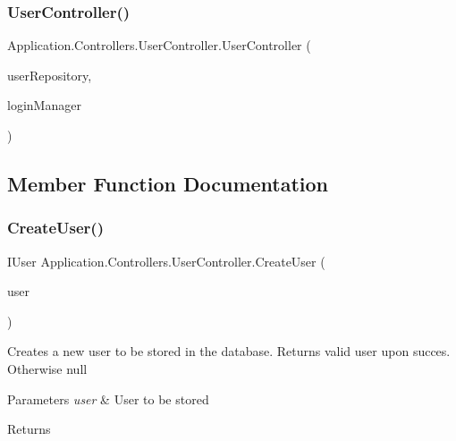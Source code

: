 \subsubsection{\texorpdfstring{User\+Controller()}{UserController()}}
{\footnotesize\ttfamily Application.\+Controllers.\+User\+Controller.\+User\+Controller (\begin{DoxyParamCaption}\item[{I\+User\+Repository}]{user\+Repository,  }\item[{\mbox{\hyperlink{interface_application_1_1_interfaces_1_1_i_login_manager}{I\+Login\+Manager}}}]{login\+Manager }\end{DoxyParamCaption})}



\subsection{Member Function Documentation}
\mbox{\label{class_application_1_1_controllers_1_1_user_controller_abf08955a5adc363fa137399a961a14fc}} 
\subsubsection{\texorpdfstring{Create\+User()}{CreateUser()}}
{\footnotesize\ttfamily I\+User Application.\+Controllers.\+User\+Controller.\+Create\+User (\begin{DoxyParamCaption}\item[{I\+User}]{user }\end{DoxyParamCaption})}



Creates a new user to be stored in the database. Returns valid user upon succes. Otherwise null 


\begin{DoxyParams}{Parameters}
{\em user} & User to be stored\\
\hline
\end{DoxyParams}
\begin{DoxyReturn}{Returns}

\end{DoxyReturn}


